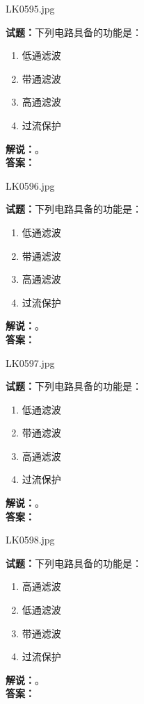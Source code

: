 \documentclass{ctexbook}
\begin{document}
\bigskip

LK0595.jpg


\noindent\textbf{试题：}下列电路具备的功能是：
\begin{enumerate}[leftmargin=3em]
\item 低通滤波
\item 带通滤波
\item 高通滤波
\item 过流保护
\end{enumerate}
\noindent\textbf{解说：}\textbf{}。\\\noindent\textbf{答案：}

\bigskip

LK0596.jpg


\noindent\textbf{试题：}下列电路具备的功能是：
\begin{enumerate}[leftmargin=3em]
\item 低通滤波
\item 带通滤波
\item 高通滤波
\item 过流保护
\end{enumerate}
\noindent\textbf{解说：}\textbf{}。\\\noindent\textbf{答案：}

\bigskip

LK0597.jpg


\noindent\textbf{试题：}下列电路具备的功能是：
\begin{enumerate}[leftmargin=3em]
\item 低通滤波
\item 带通滤波
\item 高通滤波
\item 过流保护
\end{enumerate}
\noindent\textbf{解说：}\textbf{}。\\\noindent\textbf{答案：}

\bigskip

LK0598.jpg


\noindent\textbf{试题：}下列电路具备的功能是：
\begin{enumerate}[leftmargin=3em]
\item 高通滤波
\item 低通滤波
\item 带通滤波
\item 过流保护
\end{enumerate}
\noindent\textbf{解说：}\textbf{}。\\\noindent\textbf{答案：}

\bigskip
\end{document}
